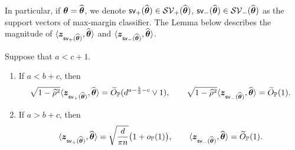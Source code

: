 In particular, if ${\boldsymbol{\theta}} = \widehat{{\boldsymbol{\theta}}}$, we denote $\mathsf{sv}_+(\widehat{{\boldsymbol{\theta}}}) \in \mathcal{SV}_+(\widehat{{\boldsymbol{\theta}}})$, $\mathsf{sv}_-(\widehat{{\boldsymbol{\theta}}}) \in \mathcal{SV}_-(\widehat{{\boldsymbol{\theta}}})$ as the support vectors of max-margin classifier. The Lemma below describes the magnitude of $\langle \text{\boldmath $z$}_{\mathsf{sv}_+(\widehat{{\boldsymbol{\theta}}})}, \widehat{{\boldsymbol{\theta}}} \rangle$ and $\langle \text{\boldmath $z$}_{\mathsf{sv}_-(\widehat{{\boldsymbol{\theta}}})}, \widehat{{\boldsymbol{\theta}}} \rangle$.

\begin{lem} \label{lem:theta_hat_z}
    Suppose that $a < c + 1$.
    \begin{enumerate}[label=(\alph*)]
        \item \label{lem:theta_hat_z(a)}
        If $a < b + c$, then 
        \begin{equation*}
            \sqrt{1 - \widehat\rho^2} \langle \text{\boldmath $z$}_{\mathsf{sv}_+(\widehat{{\boldsymbol{\theta}}})}, \widehat{{\boldsymbol{\theta}}} \rangle  =  \widetilde O_{\mathbb{P}}(d^{a-\frac{b}{2}-c} \vee 1),
            \qquad
            \sqrt{1 - \widehat\rho^2} \langle \text{\boldmath $z$}_{\mathsf{sv}_-(\widehat{{\boldsymbol{\theta}}})}, \widehat{{\boldsymbol{\theta}}} \rangle  =  \widetilde O_{\mathbb{P}}(1).
        \end{equation*}
        \item \label{lem:theta_hat_z(b)}
        If $a > b + c$, then 
        \begin{equation*}
            \langle \text{\boldmath $z$}_{\mathsf{sv}_+(\widehat{{\boldsymbol{\theta}}})}, \widehat{{\boldsymbol{\theta}}} \rangle = \sqrt{\frac{d}{\pi n}}\bigl(1 + o_{\mathbb{P}}(1)\bigr),
            \qquad
            \langle \text{\boldmath $z$}_{\mathsf{sv}_-(\widehat{{\boldsymbol{\theta}}})}, \widehat{{\boldsymbol{\theta}}} \rangle = \widetilde O_{\mathbb{P}}(1).
        \end{equation*}
    \end{enumerate}
\end{lem}
